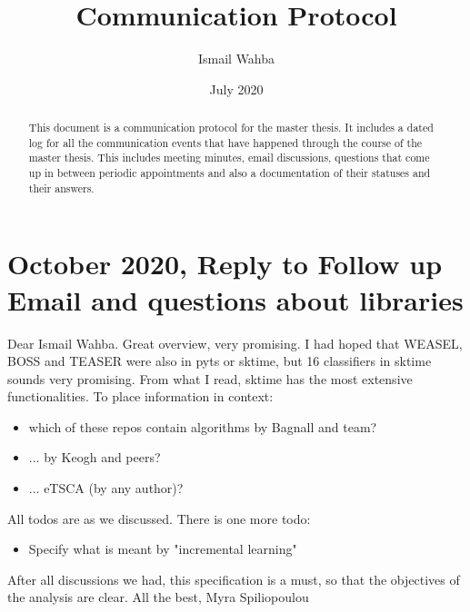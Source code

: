 \documentclass{article}
\title{Communication Protocol}
\author{Ismail Wahba }
\date{July 2020}
\begin{document}
\maketitle

\begin{abstract}
	This document is a communication protocol for the master thesis. It includes a dated log for all the communication events that have happened through the course of the master thesis. This includes meeting minutes, email discussions, questions that come up in between periodic appointments and also a documentation of their statuses and their answers.
\end{abstract}

\section*{\texorpdfstring{}. October 2020, Reply to Follow up Email and questions about libraries}
Dear Ismail Wahba.\newline
Great overview, very promising. I had hoped that WEASEL, BOSS and TEASER were also in pyts or sktime, but 16 classifiers in sktime sounds very promising. From what I read, sktime has the most extensive functionalities.\newline
To place information in context:
\begin{itemize}
	\item which of these repos contain algorithms by Bagnall and team?
	\item ... by Keogh and peers?
	\item ... eTSCA (by any author)?
\end{itemize}
All todos are as we discussed. There is one more todo:
\begin{itemize}
	\item Specify what is meant by "incremental learning"
\end{itemize}
After all discussions we had, this specification is a must, so that the objectives of the analysis are clear.\newline
All the best,
Myra Spiliopoulou
\end{document}
